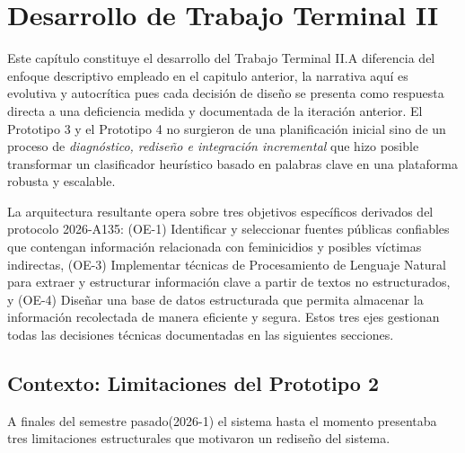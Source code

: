 
\chapter{Desarrollo de Trabajo Terminal II}
\label{cap:desarrolloTT2}

Este capítulo constituye el desarrollo del Trabajo Terminal II.A diferencia del enfoque
descriptivo empleado en el capitulo anterior, la narrativa aquí es evolutiva y
autocrítica pues cada decisión de diseño se presenta como respuesta directa
a una deficiencia medida y documentada de la iteración anterior. El Prototipo 3 y el
Prototipo 4 no surgieron de una planificación inicial sino de un proceso de \textit{diagnóstico,
rediseño e integración incremental} que hizo posible transformar
un clasificador heurístico basado en palabras clave en una plataforma robusta y escalable.

La arquitectura resultante opera sobre tres objetivos específicos derivados del protocolo
2026-A135: (OE-1) Identificar y seleccionar fuentes públicas confiables que contengan información relacionada con feminicidios y
posibles víctimas indirectas, (OE-3) Implementar técnicas de Procesamiento de Lenguaje Natural para extraer y estructurar información
clave a partir de textos no estructurados, y (OE-4) Diseñar una base de datos estructurada que permita almacenar la información
recolectada de manera eficiente y segura. Estos tres ejes gestionan todas las decisiones técnicas documentadas
en las siguientes secciones.

\section{Contexto: Limitaciones del Prototipo 2}
\label{sec:tt2_limitaciones}


A finales del semestre pasado(2026-1) el sistema hasta el momento presentaba tres limitaciones estructurales
que motivaron un rediseño del sistema.

